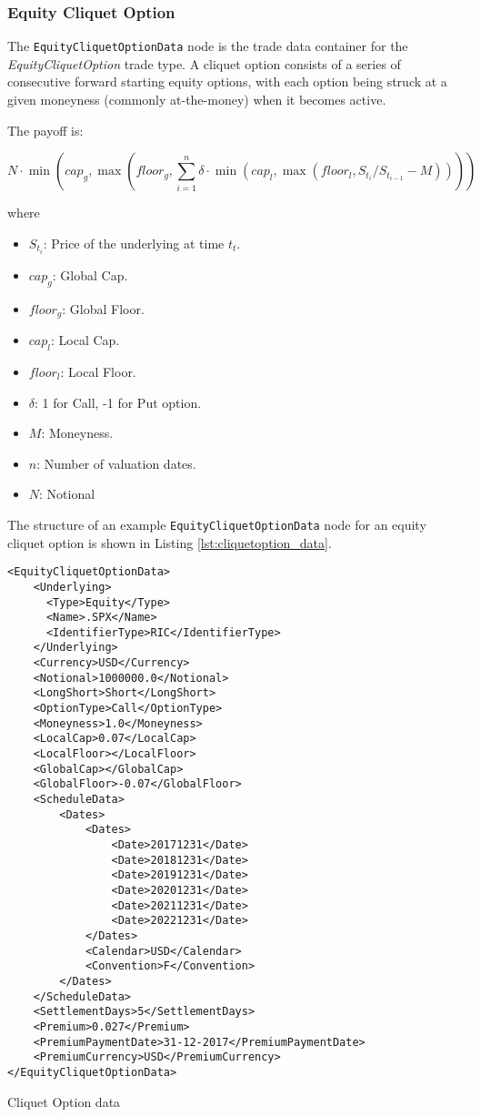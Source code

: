 \subsubsection{Equity Cliquet Option}
\label{SubSectionEqCliquetOption}

The \lstinline!EquityCliquetOptionData! node is the trade data container for the \emph{EquityCliquetOption}  trade type. A cliquet option consists of a series of consecutive forward starting equity options, with each option being struck at a given moneyness (commonly at-the-money) when it becomes active.

The payoff is:

$$
N \cdot \min\left( cap_{g}, \max \left(  floor_{g}, \sum_{i=1}^{n} \delta \cdot \min \left( cap_{l}, \max \left( floor_{l}, S_{t_{i}} / S_{t_{i-1}} - M \right) \right) \right) \right)
$$

where
\begin{itemize}
\item $S_{t_i}$: Price of the underlying at time $t_{t}$.
\item $cap_{g}$: Global Cap.
\item $floor_{g}$: Global Floor.
\item $cap_{l}$: Local Cap.
\item $floor_{l}$: Local Floor.
\item $\delta$: 1 for Call, -1 for Put option.
\item $M$: Moneyness.
\item $n$: Number of valuation dates.
\item $N$: Notional
\end{itemize}


The structure of an example \lstinline!EquityCliquetOptionData! node for an equity cliquet option is shown in Listing \ref{lst:cliquetoption_data}.

\begin{listing}[H]
	\begin{verbatim}
<EquityCliquetOptionData>
    <Underlying>
      <Type>Equity</Type>
      <Name>.SPX</Name>
      <IdentifierType>RIC</IdentifierType>
    </Underlying>
    <Currency>USD</Currency>
    <Notional>1000000.0</Notional>
    <LongShort>Short</LongShort>
    <OptionType>Call</OptionType>
    <Moneyness>1.0</Moneyness>
    <LocalCap>0.07</LocalCap>
    <LocalFloor></LocalFloor>
    <GlobalCap></GlobalCap>
    <GlobalFloor>-0.07</GlobalFloor>
    <ScheduleData>
        <Dates>
            <Dates>
                <Date>20171231</Date>
                <Date>20181231</Date>
                <Date>20191231</Date>
                <Date>20201231</Date>
                <Date>20211231</Date>
                <Date>20221231</Date>
            </Dates>
            <Calendar>USD</Calendar>
            <Convention>F</Convention>
        </Dates>    
    </ScheduleData>
    <SettlementDays>5</SettlementDays>
    <Premium>0.027</Premium>
    <PremiumPaymentDate>31-12-2017</PremiumPaymentDate>
    <PremiumCurrency>USD</PremiumCurrency>
</EquityCliquetOptionData>
    \end{verbatim}
    \caption{Cliquet Option data}
	\label{lst:cliquetoption_data}
\end{listing}

